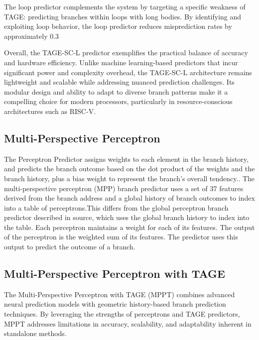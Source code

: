 \documentclass[10pt,journal,compsoc]{IEEEtran}
\begin{document}
The loop predictor complements the system by targeting a specific weakness of TAGE: predicting branches within loops with long bodies. By identifying and exploiting loop behavior, the loop predictor reduces misprediction rates by approximately 0.3%

Overall, the TAGE-SC-L predictor exemplifies the practical balance of accuracy and hardware efficiency. Unlike machine learning-based predictors that incur significant power and complexity overhead, the TAGE-SC-L architecture remains lightweight and scalable while addressing nuanced prediction challenges. Its modular design and ability to adapt to diverse branch patterns make it a compelling choice for modern processors, particularly in resource-conscious architectures such as RISC-V.

\subsection{Multi-Perspective Perceptron}
\noindent The Perceptron Predictor assigns weights to each element in the branch history, and predicts the branch outcome based on the dot product of the weights and the branch history, plus a bias weight to represent the branch's overall tendency.\cite{tarjanMergingPathGshare2005}. 
The multi-perspective perceptron (MPP) branch predictor uses a set of 37 features derived from the branch address and a global history of branch outcomes to index into a table of perceptrons.\cite{multi1}This differs from the global perceptron branch predictor described in source, which uses the global branch history to index into the table. Each perceptron maintains a weight for each of its features. The output of the perceptron is the weighted sum of its features. The predictor uses this output to predict the outcome of a branch.
\subsection{Multi-Perspective Perceptron with TAGE}
\noindent
The Multi-Perspective Perceptron with TAGE (MPPT) combines advanced neural prediction models with geometric history-based branch prediction techniques. By leveraging the strengths of perceptrons and TAGE predictors, MPPT addresses limitations in accuracy, scalability, and adaptability inherent in standalone methods.
\end{document}
